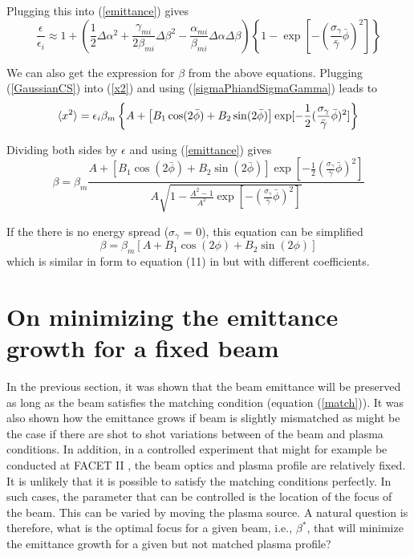 \documentclass[%
reprint, superscriptaddress,
 amsmath,amssymb, aps,
prstab,
]{revtex4-2}
\begin{document}
Plugging this into (\ref{emittance}) gives
\[
\frac{\epsilon}{\epsilon_i} \approx 1 +  ( \frac{1}{2} \Delta \alpha^2 + \frac{\gamma_{mi}}{2\beta_{mi}} \Delta \beta^2 - \frac{\alpha_{mi}}{\beta_{mi}} \Delta \alpha \Delta \beta )\left \{1-\exp[-(\frac{\sigma_\gamma}{\bar \gamma}\bar \phi)^2]\right \}
\]

We can also get the expression for $\beta$ from the above equations. Plugging (\ref{GaussianCS}) into (\ref{x2}) and using (\ref{sigmaPhiandSigmaGamma}) leads to
\[
\braket{x^2} =\epsilon_i \beta_m \left \{A + \left [B_1 \cos(2\bar \phi) + B_2 \sin(2\bar \phi) \right ] \exp [-\frac{1}{2}(\frac{\sigma_\gamma}{\bar \gamma}\bar \phi)^2 ] \right \}
\]

Dividing both sides by  $\epsilon$ and using (\ref{emittance}) gives
\begin{equation}
\beta =  \beta_m \frac{A + \left [B_1 \cos(2\bar \phi) + B_2 \sin(2\bar \phi) \right ] \exp [-\frac{1}{2}(\frac{\sigma_\gamma}{\bar \gamma}\bar \phi)^2 ]}{A\sqrt{ 1-\frac{A^2-1}{A^2} \exp[-(\frac{\sigma_\gamma}{\bar \gamma}\bar \phi)^2]}}
\end{equation}

If the there is no energy spread ($\sigma_\gamma$ = 0), this equation can be simplified
\begin{equation}
\beta =  \beta_m \left [A + B_1 \cos(2 \phi) + B_2 \sin(2 \phi) \right ] 
\end{equation}
which is similar in form to equation (11) in \cite{Robert} but with different coefficients.

\section{On minimizing the emittance growth for a fixed beam} 
In the previous section, it was shown that the beam emittance will be preserved as long as
the beam satisfies the matching condition (equation (\ref{match})). 
It was also shown how the emittance grows if beam is slightly mismatched as might be the case if there are shot to shot variations between of the beam and plasma conditions. In addition,  in a controlled experiment that might for example be conducted at FACET II \cite{match}, the beam optics and plasma profile are relatively fixed. It is unlikely that it is possible to satisfy the matching conditions perfectly.  In such cases, the parameter that can be controlled  is the location of the focus of the beam. This can be varied by moving the plasma source. A natural question is therefore, what is the optimal focus for a given beam, i.e., $\beta^*$, that will minimize the emittance growth for a given but not matched plasma profile?   
  
\end{document}

